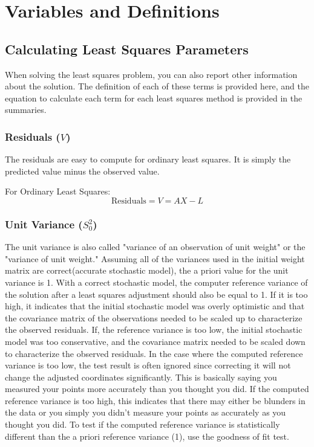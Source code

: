 \section{Variables and Definitions}

\subsection{Calculating Least Squares Parameters}
When solving the least squares problem, you can also report other information about the solution.  The definition of each of these terms is provided here, and the equation to calculate each term for each least squares method is provided in the summaries.

\subsubsection*{Residuals ($V$)}
The residuals are easy to compute for ordinary least squares.  It is simply the predicted value minus the observed value.

For Ordinary Least Squares:
\[
\text{Residuals} = V = AX - L
\]
\subsubsection*{Unit Variance ($S_0^2$)}
The unit variance is also called "variance of an observation of unit weight" or the "variance of unit weight."  Assuming all of the variances used in the initial weight matrix are correct(accurate stochastic model), the a priori value for the unit variance is 1.  With a correct stochastic model, the computer reference variance of the solution after a least squares adjustment should also be equal to 1.  If it is too high, it indicates that the initial stochastic model was overly optimistic and that the covariance matrix of the observations needed to be scaled up to characterize the observed residuals.  If, the reference variance is too low, the initial stochastic model was too conservative, and the covariance matrix needed to be scaled down to characterize the observed residuals.  In the case where the computed reference variance is too low, the test result is often ignored since correcting it will not change the adjusted coordinates significantly.  This is basically saying you measured your points more accurately than you thought you did.  If the computed reference variance is too high, this indicates that there may either be blunders in the data or you simply you didn't measure your points as accurately as you thought you did.  To test if the computed reference variance is statistically different than the a priori reference variance (1), use the goodness of fit test.

